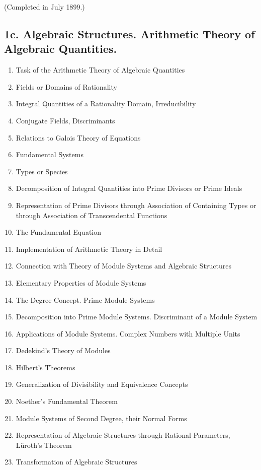 \vspace{-0.1cm}
{\normalfont(Completed in July 1899.)}

\subsection*{\small1c. Algebraic Structures. Arithmetic Theory of Algebraic Quantities. \newline {}}

\begin{enumerate}[itemsep=0pt]
    \item Task of the Arithmetic Theory of Algebraic Quantities
    \item Fields or Domains of Rationality
    \item Integral Quantities of a Rationality Domain, Irreducibility
    \item Conjugate Fields, Discriminants
    \item Relations to Galois Theory of Equations
    \item Fundamental Systems
    \item Types or Species
    \item Decomposition of Integral Quantities into Prime Divisors or Prime Ideals
    \item Representation of Prime Divisors through Association of Containing Types or through Association of Transcendental Functions
    \item The Fundamental Equation
    \item Implementation of Arithmetic Theory in Detail
    \item Connection with Theory of Module Systems and Algebraic Structures
    \item Elementary Properties of Module Systems
    \item The Degree Concept. Prime Module Systems
    \item Decomposition into Prime Module Systems. Discriminant of a Module System
    \item Applications of Module Systems. Complex Numbers with Multiple Units
    \item Dedekind's Theory of Modules
    \item Hilbert's Theorems
    \item Generalization of Divisibility and Equivalence Concepts
    \item Noether's Fundamental Theorem
    \item Module Systems of Second Degree, their Normal Forms
    \item Representation of Algebraic Structures through Rational Parameters, Lüroth's Theorem
    \item Transformation of Algebraic Structures
\end{enumerate}

